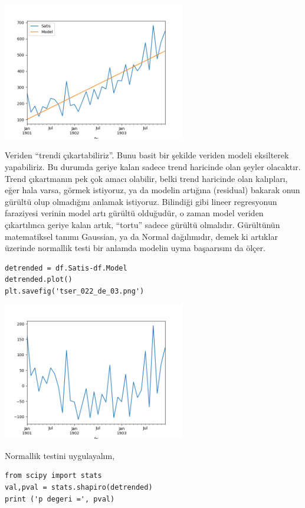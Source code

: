 \documentclass[12pt,fleqn]{article}\usepackage{../../common}
\begin{document}
\includegraphics[height=6cm]{tser_022_de_01.png}

Veriden ``trendi çıkartabiliriz''. Bunu basit bir şekilde veriden modeli
eksilterek yapabiliriz. Bu durumda geriye kalan sadece trend haricinde olan
şeyler olacaktır. Trend çıkartmanın pek çok amacı olabilir, belki trend
haricinde olan kalıpları, eğer hala varsa, görmek istiyoruz, ya da modelin
artığına (residual) bakarak onun gürültü olup olmadığını anlamak
istiyoruz. Bilindiği gibi lineer regresyonun faraziyesi verinin model artı
gürültü olduğudür, o zaman model veriden çıkartılınca geriye kalan artık,
``tortu'' sadece gürültü olmalıdır. Gürültünün matematiksel tanımı Gaussian, ya
da Normal dağılımıdır, demek ki artıklar üzerinde normallik testi bir anlamda
modelin uyma başaarısını da ölçer.

\begin{verbatim}
detrended = df.Satis-df.Model
detrended.plot()
plt.savefig('tser_022_de_03.png')
\end{verbatim}

\includegraphics[height=6cm]{tser_022_de_03.png}

Normallik testini uygulayalım,

\begin{verbatim}
from scipy import stats
val,pval = stats.shapiro(detrended)
print ('p degeri =', pval)
\end{verbatim}
\end{document}
